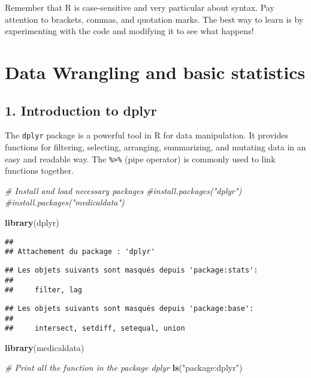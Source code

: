\documentclass[
]{book}
\newenvironment{Shaded}{\begin{snugshade}}{\end{snugshade}}
\newcommand{\CommentTok}[1]{\textcolor[rgb]{0.56,0.35,0.01}{\textit{#1}}}
\newcommand{\FunctionTok}[1]{\textcolor[rgb]{0.13,0.29,0.53}{\textbf{#1}}}
\newcommand{\NormalTok}[1]{#1}
\newcommand{\StringTok}[1]{\textcolor[rgb]{0.31,0.60,0.02}{#1}}
\begin{document}
Remember that R is case-sensitive and very particular about syntax. Pay attention to brackets, commas, and quotation marks. The best way to learn is by experimenting with the code and modifying it to see what happens!

\chapter{Data Wrangling and basic statistics}\label{data-wrangling-and-basic-statistics}

\section{1. Introduction to dplyr}\label{introduction-to-dplyr}

The \texttt{dplyr} package is a powerful tool in R for data manipulation. It provides functions for filtering, selecting, arranging, summarizing, and mutating data in an easy and readable way. The \texttt{\%\textgreater{}\%} (pipe operator) is commonly used to link functions together.

\begin{Shaded}
\begin{Highlighting}[]
\CommentTok{\# Install and load necessary packages}
\CommentTok{\#install.packages("dplyr")}
\CommentTok{\#install.packages("medicaldata")}

\FunctionTok{library}\NormalTok{(dplyr)}
\end{Highlighting}
\end{Shaded}

\begin{verbatim}
## 
## Attachement du package : 'dplyr'
\end{verbatim}

\begin{verbatim}
## Les objets suivants sont masqués depuis 'package:stats':
## 
##     filter, lag
\end{verbatim}

\begin{verbatim}
## Les objets suivants sont masqués depuis 'package:base':
## 
##     intersect, setdiff, setequal, union
\end{verbatim}

\begin{Shaded}
\begin{Highlighting}[]
\FunctionTok{library}\NormalTok{(medicaldata)}

\CommentTok{\# Print all the function in the package dplyr}
\FunctionTok{ls}\NormalTok{(}\StringTok{"package:dplyr"}\NormalTok{)}
\end{Highlighting}
\end{Shaded}
\end{document}

